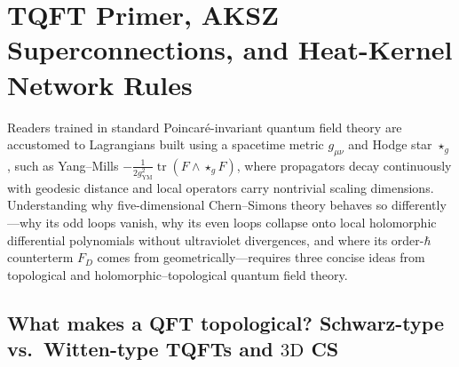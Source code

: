 \documentclass[11pt,letterpaper]{article}
\numberwithin{equation}{section}
\theoremstyle{plain}
\theoremstyle{definition}
\theoremstyle{remark}
\newcommand{\tr}{\operatorname{tr}}
\begin{document}
\section{TQFT Primer, AKSZ Superconnections, and Heat-Kernel Network Rules}
\label{sec:tqft-primer}

Readers trained in standard Poincaré-invariant quantum field theory are accustomed to Lagrangians built using a spacetime metric $g_{\mu\nu}$ and Hodge star $\star_g$, such as Yang--Mills $-\frac{1}{2g_{\mathrm{YM}}^2}\tr(F \wedge \star_g F)$, where propagators decay continuously with geodesic distance and local operators carry nontrivial scaling dimensions. Understanding why five-dimensional Chern--Simons theory behaves so differently---why its odd loops vanish, why its even loops collapse onto local holomorphic differential polynomials without ultraviolet divergences, and where its order-$\hbar$ counterterm $F_D$ comes from geometrically---requires three concise ideas from topological and holomorphic--topological quantum field theory.

\subsection{What makes a QFT topological? Schwarz-type vs.\ Witten-type TQFTs and $3\mathrm{D}$ CS}
\label{subsec:tqft-basics}
\end{document}
